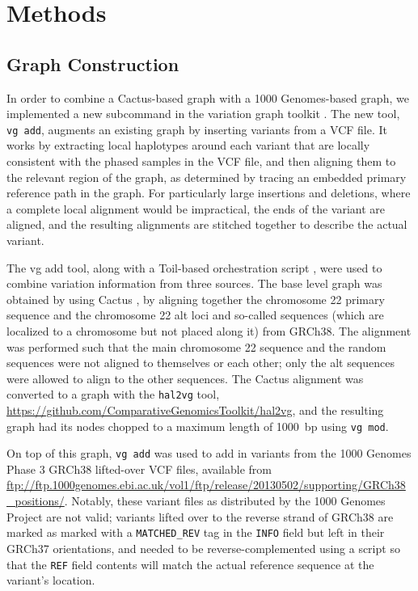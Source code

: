 \section{Methods}

\subsection{Graph Construction}

In order to combine a Cactus-based graph with a 1000 Genomes-based graph, we implemented a new subcommand in the \vg variation graph toolkit \cite{garrison2016vg}. The new tool, \texttt{vg add}, augments an existing graph by inserting variants from a VCF file. It works by extracting local haplotypes around each variant that are locally consistent with the phased samples in the VCF file, and then aligning them to the relevant region of the graph, as determined by tracing an embedded primary reference path in the graph. For particularly large insertions and deletions, where a complete local alignment would be impractical, the ends of the variant are aligned, and the resulting alignments are stitched together to describe the actual variant.

The vg add tool, along with a Toil-based orchestration script \cite{vivian2017toil}, were used to combine variation information from three sources. The base level graph was obtained by using Cactus \cite{paten2011cactus2}, by aligning together the chromosome 22 primary sequence and the chromosome 22 alt loci and so-called  sequences (which are localized to a chromosome but not placed along it) from GRCh38. The alignment was performed such that the main chromosome 22 sequence and the random sequences were not aligned to themselves or each other; only the alt sequences were allowed to align to the other sequences.
The Cactus alignment was converted to a \vg graph with the \texttt{hal2vg} tool, \url{https://github.com/ComparativeGenomicsToolkit/hal2vg}, and the resulting graph had its nodes chopped to a maximum length of 1000~bp using \texttt{vg mod}.

\begin{sloppypar}
On top of this graph, \texttt{vg add} was used to add in variants from the 1000 Genomes Phase 3 GRCh38 lifted-over VCF files, available from \url{ftp://ftp.1000genomes.ebi.ac.uk/vol1/ftp/release/20130502/supporting/GRCh38_positions/}. Notably, these variant files as distributed by the 1000 Genomes Project are not valid; variants lifted over to the reverse strand of GRCh38 are marked as marked with a \texttt{MATCHED\_REV} tag in the \texttt{INFO} field but left in their GRCh37 orientations, and needed to be reverse-complemented using a script so that the \texttt{REF} field contents will match the actual reference sequence at the variant's location.
\end{sloppypar}

